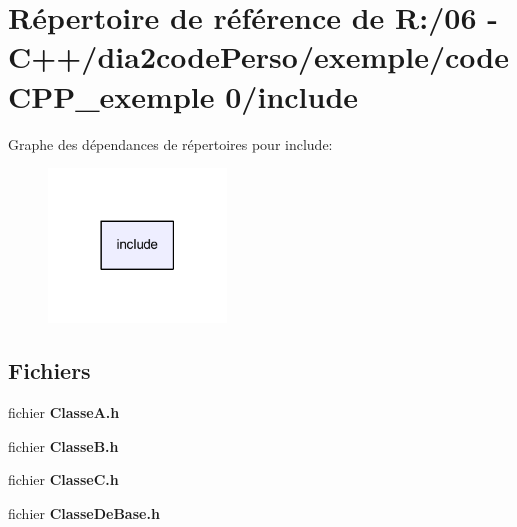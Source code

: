 \section{Répertoire de référence de R\+:/06 -\/ C++/dia2code\+Perso/exemple/code\+C\+P\+P\+\_\+exemple 0/include}
\label{dir_d44c64559bbebec7f509842c48db8b23}
Graphe des dépendances de répertoires pour include\+:\nopagebreak
\begin{figure}[H]
\begin{center}
\leavevmode
\includegraphics[width=134pt]{dir_d44c64559bbebec7f509842c48db8b23_dep}
\end{center}
\end{figure}
\subsection*{Fichiers}
\begin{DoxyCompactItemize}
\item 
fichier {\bf Classe\+A.\+h}
\item 
fichier {\bf Classe\+B.\+h}
\item 
fichier {\bf Classe\+C.\+h}
\item 
fichier {\bf Classe\+De\+Base.\+h}
\end{DoxyCompactItemize}
